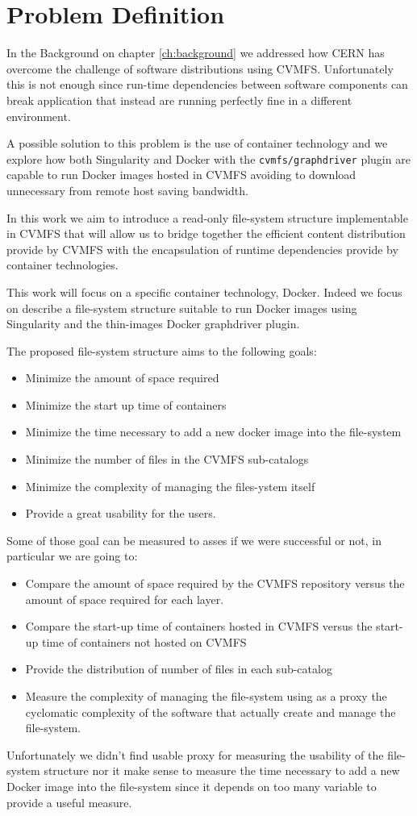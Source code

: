 \chapter{Problem Definition}\label{ch:ProblemDefinition}

In the Background on chapter \ref{ch:background} we addressed how CERN has
overcome the challenge of software distributions using CVMFS. Unfortunately
this is not enough since run-time dependencies between software components can
break application that instead are running perfectly fine in a different
environment.

A possible solution to this problem is the use of container technology and we
explore how both Singularity and Docker with the \texttt{cvmfs/graphdriver}
plugin are capable to run Docker images hosted in CVMFS avoiding to download
unnecessary from remote host saving bandwidth.

In this work we aim to introduce a read-only file-system structure
implementable in CVMFS that will allow us to bridge together the efficient
content distribution provide by CVMFS with the encapsulation of runtime
dependencies provide by container technologies.

This work will focus on a specific container technology, Docker. Indeed we
focus on describe a file-system structure suitable to run Docker images using
Singularity and the thin-images Docker graphdriver plugin.

The proposed file-system structure aims to the following goals:
\begin{itemize}
\item Minimize the amount of space required
\item Minimize the start up time of containers
\item Minimize the time necessary to add a new docker image into the file-system
\item Minimize the number of files in the CVMFS sub-catalogs 
\item Minimize the complexity of managing the files-ystem itself
\item Provide a great usability for the users.
\end{itemize}

Some of those goal can be measured to asses if we were successful or not, in
particular we are going to:

\begin{itemize}
\item Compare the amount of space required by the CVMFS repository versus the
        amount of space required for each layer.
\item Compare the start-up time of containers hosted in CVMFS versus the
        start-up time of containers not hosted on CVMFS
\item Provide the distribution of number of files in each sub-catalog
\item Measure the complexity of managing the file-system using as a proxy the
        cyclomatic complexity of the software that actually create and manage
                the file-system.
\end{itemize}

Unfortunately we didn't find usable proxy for measuring the usability of the
file-system structure nor it make sense to measure the time necessary to add a
new Docker image into the file-system since it depends on too many variable to
provide a useful measure.
